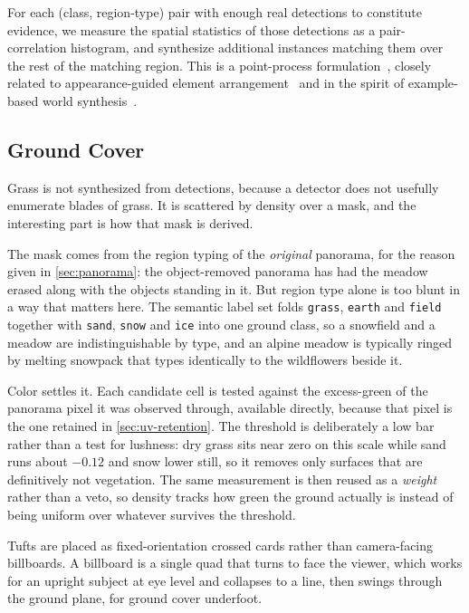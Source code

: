 For each (class, region-type) pair with enough real detections to constitute
evidence, we measure the spatial statistics of those detections as a
pair-correlation histogram, and synthesize additional instances matching them over
the rest of the matching region. This is a point-process
formulation~\cite{9cfc5dfd-c17c-3458-81d1-9c27d3a321e8}, closely related to
appearance-guided element arrangement~\cite{10.1145/1572614.1572623} and in the
spirit of example-based world synthesis~\cite{10.1145/2766975}.

\subsection{Ground Cover}

Grass is not synthesized from detections, because a detector does not usefully
enumerate blades of grass. It is scattered by density over a mask, and the
interesting part is how that mask is derived.

The mask comes from the region typing of the \emph{original} panorama, for the
reason given in \cref{sec:panorama}: the object-removed panorama has had the
meadow erased along with the objects standing in it. But region type alone is too
blunt in a way that matters here. The semantic label set folds \texttt{grass},
\texttt{earth} and \texttt{field} together with \texttt{sand}, \texttt{snow} and
\texttt{ice} into one ground class, so a snowfield and a meadow are
indistinguishable by type, and an alpine meadow is typically ringed by melting
snowpack that types identically to the wildflowers beside it.

Color settles it. Each candidate cell is tested against the excess-green of the
panorama pixel it was observed through, available directly, because that pixel
is the one retained in \cref{sec:uv-retention}. The threshold is deliberately a low
bar rather than a test for lushness: dry grass sits near zero on this scale while
sand runs about $-0.12$ and snow lower still, so it removes only surfaces that are
definitively not vegetation. The same measurement is then reused as a
\emph{weight} rather than a veto, so density tracks how green the ground actually
is instead of being uniform over whatever survives the threshold.

Tufts are placed as fixed-orientation crossed cards rather than camera-facing
billboards. A billboard is a single quad that turns to face the viewer, which
works for an upright subject at eye level and collapses to a line, then swings
through the ground plane, for ground cover underfoot.
